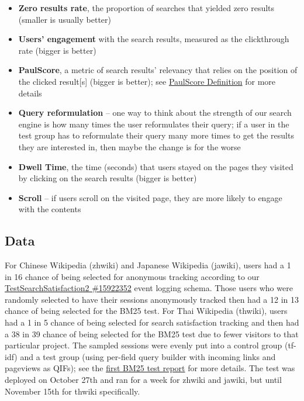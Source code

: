 \documentclass[12pt,]{article}
\providecommand{\tightlist}{%
  \setlength{\itemsep}{0pt}\setlength{\parskip}{0pt}}
\begin{document}
\begin{itemize}
\tightlist
\item
  \textbf{Zero results rate}, the proportion of searches that yielded
  zero results (smaller is usually better)
\item
  \textbf{Users' engagement} with the search results, measured as the
  clickthrough rate (bigger is better)
\item
  \textbf{PaulScore}, a metric of search results' relevancy that relies
  on the position of the clicked result{[}s{]} (bigger is better); see
  \href{https://wikimedia-research.github.io/Discovery-Search-Test-BM25/\#paulscore_definition}{PaulScore
  Definition} for more details
\item
  \textbf{Query reformulation} -- one way to think about the strength of
  our search engine is how many times the user reformulates their query;
  if a user in the test group has to reformulate their query many more
  times to get the results they are interested in, then maybe the change
  is for the worse
\item
  \textbf{Dwell Time}, the time (seconds) that users stayed on the pages
  they visited by clicking on the search results (bigger is better)
\item
  \textbf{Scroll} -- if users scroll on the visited page, they are more
  likely to engage with the contents
\end{itemize}

\subsection{Data}\label{data}

For Chinese Wikipedia (zhwiki) and Japanese Wikipedia (jawiki), users
had a 1 in 16 chance of being selected for anonymous tracking according
to our
\href{https://meta.wikimedia.org/w/index.php?title=Schema:TestSearchSatisfaction2\&id=15922352}{TestSearchSatisfaction2
\#15922352} event logging schema. Those users who were randomly selected
to have their sessions anonymously tracked then had a 12 in 13 chance of
being selected for the BM25 test. For Thai Wikipedia (thwiki), users had
a 1 in 5 chance of being selected for search satisfaction tracking and
then had a 38 in 39 chance of being selected for the BM25 test due to
fewer visitors to that particular project. The sampled sessions were
evenly put into a control group (tf-idf) and a test group (using
per-field query builder with incoming links and pageviews as QIFs); see
the
\href{https://wikimedia-research.github.io/Discovery-Search-Test-BM25/\#data}{first
BM25 test report} for more details. The test was deployed on October
27th and ran for a week for zhwiki and jawiki, but until November 15th
for thwiki specifically.
\end{document}
